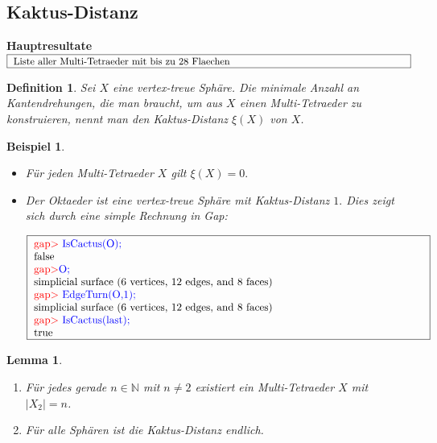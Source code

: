\documentclass[12pt,titlepage,twoside,cleardoublepage]{article}
\theoremstyle{nummermitklammern}
\newtheorem{lemma}[temp]{Lemma}
\newtheorem{bsp}[temp]{Beispiel}
\newtheorem{definition}[temp]{Definition}
\newtheorem{definition}[zahl]{Definition}
\newtheorem{lemma}[zahl]{Lemma}
\newtheorem{bsp}[zahl]{Beispiel}
\numberwithin{equation}{section}
\begin{document}
\subsection{Kaktus-Distanz}
\textbf{Hauptresultate}\\
$\fbox{
\parbox{14cm}{Liste aller Multi-Tetraeder mit bis zu 28 Flaechen}}$
\begin{definition}
Sei $X$ eine vertex-treue Sphäre. Die minimale Anzahl an Kantendrehungen, die man braucht, um aus $X$ einen Multi-Tetraeder zu  konstruieren, nennt man den \emph{Kaktus-Distanz} $\xi(X)$ von $X$.
\end{definition}
\begin{bsp}
\begin{itemize}
\item Für jeden Multi-Tetraeder $X$ gilt $\xi(X)=0.$
\item Der Oktaeder ist eine vertex-treue Sphäre mit Kaktus-Distanz $1.$ Dies zeigt sich durch eine simple Rechnung in Gap:
\begin{center}
$\fbox{
\parbox{13cm}{
\textcolor{red}{gap$>$} \textcolor{blue}{IsCactus(O);}\\
false\\
\textcolor{red}{gap$>$}\textcolor{blue}{ O;}\\
simplicial surface (6 vertices, 12 edges, and 8 faces)\\
\textcolor{red}{gap$>$} \textcolor{blue}{EdgeTurn(O,1);}\\
simplicial surface (6 vertices, 12 edges, and 8 faces)\\
\textcolor{red}{gap$>$} \textcolor{blue}{IsCactus(last);}\\
true
}}$
\end{center}
\end{itemize}
\end{bsp}
\begin{lemma}
\begin{enumerate}
\item
Für jedes gerade $n \in \mathbb{N}$ mit $n \neq 2$ existiert ein Multi-Tetraeder $X$ mit $\vert X_2\vert=n$.
\item
Für alle Sphären ist die Kaktus-Distanz endlich.
\end{enumerate} 
\end{lemma}
\end{document}
